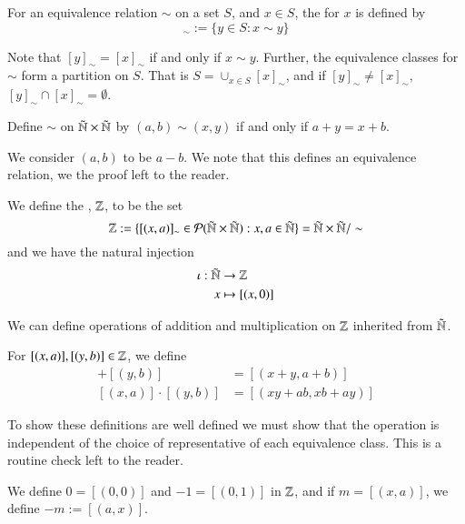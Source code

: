 \begin{defn}
    For an equivalence relation $\sim$ on a set $S$, and $x \in S$, the  for $x$ is defined by \begin{equation*}
        [x]_{\sim} := \{y \in S: x \sim y\}
    \end{equation*}
\end{defn}

Note that $[y]_{\sim} = [x]_{\sim}$ if and only if $x \sim y$. Further, the equivalence classes for $\sim $ form a partition on $S$. That is $S = \cup_{x \in S}[x]_{\sim}$, and if $[y]_{\sim} \neq [x]_{\sim},$ $[y]_{\sim}\cap[x]_{\sim} = \emptyset$.

\begin{defn}
    Define $\sim$ on $\tilde{\mathbb N}\times \tilde{\mathbb N}$ by $(a,b) \sim(x,y)$ if and only if $a+y = x+b$.
\end{defn}
We consider $(a,b)$ to be $a-b$. We note that this defines an equivalence relation, we the proof left to the reader.

\begin{defn}
    We define the , $\mathbb Z$, to be the set \begin{equation*}
        \mathbb Z := \{[(x,a)]_{\sim} \in \mathcal{P}(\tilde{\mathbb N}\times\tilde{\mathbb N}): x,a \in \tilde{\mathbb N}\} = \tilde{\mathbb N}\times\tilde{\mathbb N}/\sim
    \end{equation*}
    and we have the natural injection \begin{align*}
        \iota:\tilde{\mathbb N}&\rightarrow \mathbb Z \\
        x&\mapsto [(x,0)]
    \end{align*}
\end{defn}

We can define operations of addition and multiplication on $\mathbb Z$ inherited from $\tilde{\mathbb N}$.

\begin{defn}
    For $[(x,a)],[(y,b)] \in \mathbb Z$, we define \begin{align*}
        [(x,a)]+[(y,b)] &= [(x+y,a+b)] \\
        [(x,a)]\cdot[(y,b)] &= [(xy + ab, xb + ay)]
    \end{align*}
\end{defn}
To show these definitions are well defined we must show that the operation is independent of the choice of representative of each equivalence class. This is a routine check left to the reader.

\begin{defn}
    We define $0 = [(0,0)]$ and $-1 = [(0,1)]$ in $\mathbb Z$, and if $m = [(x,a)]$, we define $-m := [(a,x)]$.
\end{defn}

